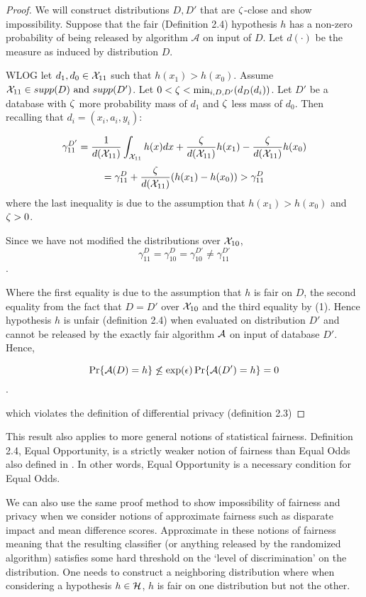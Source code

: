 \begin{proof}
	We will construct distributions $D, D'$ that are $\zeta$-close and show impossibility. Suppose that the fair (Definition 2.4) hypothesis $h$ has a non-zero probability of being released by algorithm $\mathcal{A}$ on input of $D$. Let $d(\cdot)$ be the measure as
  induced by
  distribution $D$.

  WLOG let $d_1, d_0 \in \mathcal{X}_{11}$ such that $h(x_1) >
  h(x_0)$. Assume $\mathcal{X}_{11}\in supp(D) \text{ and } supp(D')$.
  Let $0 < \zeta < \min_{i,D,D'}(d_{D}(d_i))$. Let $D'$ be a database with $\zeta$
  more probability mass of $d_1$ and $\zeta$ less mass of $d_0$. Then
  recalling that $d_i = (x_i, a_i,y_i)$:

$$\gamma_{11}^{D'} = \frac{1}{d(\mathcal{X}_{11})}\int_{\mathcal{X}_{11}}h(x)dx +
\frac{\zeta}{d(\mathcal{X}_{11})} h(x_1) - \frac{\zeta}{d(\mathcal{X}_{11})} h(x_0) $$
\begin{equation}
=\gamma_{11}^{D} + \frac{\zeta}{d(\mathcal{X}_{11})} (h(x_1) -
 h(x_0))>\gamma_{11}^{D}
\end{equation}
where the last inequality is due to the assumption that $h(x_1) >
h(x_0)$ and $\zeta >0$.

Since we have not modified the distributions over $\mathcal{X}_{10}$,
$$\gamma_{11}^D = \gamma_{10}^{D} = \gamma_{10}^{D'} \neq  \gamma_{11}^{D'}$$.

Where the first equality is due to the assumption that $h$ is fair on $D$,
 the second equality from the fact that $D=D'$ over $\mathcal{X}_{10}$ and the third
 equality by (1). Hence hypothesis $h$ is unfair (definition
 2.4) when evaluated on distribution $D'$
 and cannot be released by the exactly fair algorithm $\mathcal{A}$ on input of
 database $D'$. Hence,

$$\Pr\{\mathcal{A}(D) = h\} \not\leq \exp(\epsilon)\Pr\{\mathcal{A}(D') = h\} = 0$$.

which violates the definition of differential privacy (definition 2.3)
\end{proof}

This result also applies to more general notions of statistical fairness. Definition 2.4, Equal Opportunity, is a strictly weaker notion of fairness than Equal Odds also defined in \citet{hardteqop}. In other words, Equal Opportunity is a necessary condition for Equal Odds.

We can also use the same proof method to show impossibility of fairness and privacy
when we consider notions of approximate fairness such as disparate impact and mean
difference scores. Approximate in these notions of fairness meaning that the
resulting classifier (or anything released by the randomized algorithm) satisfies some hard threshold on the `level of discrimination' on the distribution.
One needs to construct a neighboring distribution where when considering a hypothesis $h\in \mathcal{H}$, $h$ is fair on one distribution but not the other.


